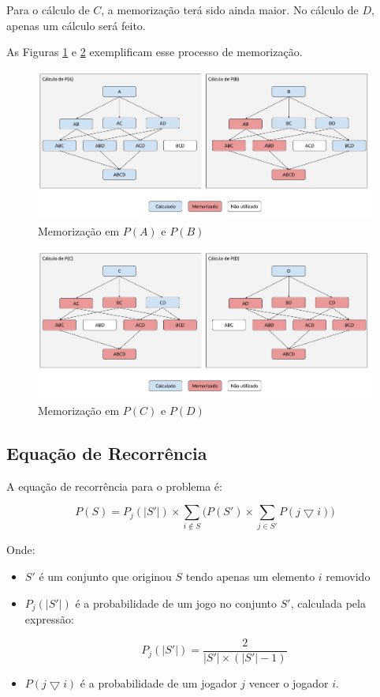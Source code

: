 \documentclass[10pt,a4paper]{article}
\begin{document}
	Para o cálculo de $C$, a memorização terá sido ainda maior. No cálculo de $D$, apenas um cálculo será feito.

	As Figuras \ref{fig_memorizacao1} e \ref{fig_memorizacao2} exemplificam esse processo de memorização.

	\begin{figure}[H]
		\centering
		\caption{Memorização em $P(A)$ e $P(B)$}
		\label{fig_memorizacao1}
		\includegraphics[scale=0.34]{diagrama_n4_a_b}
	\end{figure}

	\begin{figure}[H]
		\centering
		\caption{Memorização em $P(C)$ e $P(D)$}
		\label{fig_memorizacao2}
		\includegraphics[scale=0.34]{diagrama_n4_c_d}
	\end{figure}

	\subsection{Equação de Recorrência}

	A equação de recorrência para o problema é:

	$$ {P(S)} = P_j(|S'|) \times \sum_{i \notin S} \Big( P(S') \times \sum_{j \in S'} P(j \bigtriangledown i) \Big) $$

	Onde: 

	\begin{itemize}

		\item $S'$ é um conjunto que originou $S$ tendo apenas um elemento $i$ removido

		\item $P_j(|S'|)$ é a probabilidade de um jogo no conjunto $S'$, calculada pela expressão:
		
		$$P_j(|S'|) = \frac{2}{|S'| \times (|S'| - 1)}$$

		\item $P(j \bigtriangledown i)$ é a probabilidade de um jogador $j$ vencer o jogador $i$.

	\end{itemize}
\end{document}
